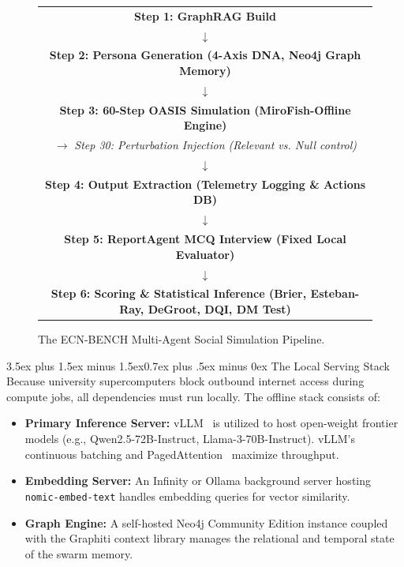 \documentclass[11pt,journal,onecolumn]{IEEEtran}
\makeatletter
\renewcommand\subsection{\@startsection{subsection}{2}{\z@}%
  {3.5ex plus 1.5ex minus 1.5ex}{0.7ex plus .5ex minus 0ex}%
  {\normalfont\normalsize\bfseries}}
\makeatother
\begin{document}
\begin{figure}[!tbp]
\centering
\begin{tabular}{|c|}
\hline
\textbf{Step 1: GraphRAG Build} \\
$\downarrow$ \\
\textbf{Step 2: Persona Generation (4-Axis DNA, Neo4j Graph Memory)} \\
$\downarrow$ \\
\textbf{Step 3: 60-Step OASIS Simulation (MiroFish-Offline Engine)} \\
$\rightarrow$ \textit{Step 30: Perturbation Injection (Relevant vs. Null control)} \\
$\downarrow$ \\
\textbf{Step 4: Output Extraction (Telemetry Logging \& Actions DB)} \\
$\downarrow$ \\
\textbf{Step 5: ReportAgent MCQ Interview (Fixed Local Evaluator)} \\
$\downarrow$ \\
\textbf{Step 6: Scoring \& Statistical Inference (Brier, Esteban-Ray, DeGroot, DQI, DM Test)} \\
\hline
\end{tabular}
\caption{The ECN-BENCH Multi-Agent Social Simulation Pipeline.}
\label{fig:pipeline}
\end{figure}

\subsection{The Local Serving Stack}
Because university supercomputers block outbound internet access during compute jobs, all dependencies must run locally. The offline stack consists of:
\begin{itemize}
    \item \textbf{Primary Inference Server:} vLLM~\cite{vllm} is utilized to host open-weight frontier models (e.g., Qwen2.5-72B-Instruct, Llama-3-70B-Instruct). vLLM's continuous batching and PagedAttention~\cite{vllm} maximize throughput.
    \item \textbf{Embedding Server:} An Infinity or Ollama background server hosting \texttt{nomic-embed-text} handles embedding queries for vector similarity.
    \item \textbf{Graph Engine:} A self-hosted Neo4j Community Edition instance coupled with the Graphiti context library manages the relational and temporal state of the swarm memory.
\end{itemize}
\end{document}
